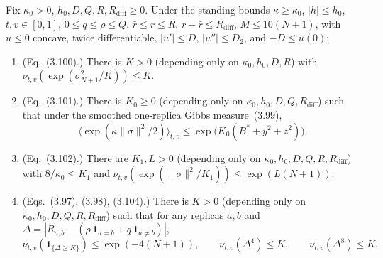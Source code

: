 \begin{lemma}\label{lem:sg-tal:st-aux-tails}
  \leanok
Fix $\kappa_0>0$, $h_0,D,Q,R,R_{\mathrm{diff}}\ge0$. Under the standing bounds $\kappa\ge\kappa_0$,
$|h|\le h_0$, $t,v\in[0,1]$, $0\le q\le\rho\le Q$, $\bar r\le r\le R$, $r-\bar r\le R_{\mathrm{diff}}$,
$M\le 10(N+1)$, with $u\le0$ concave, twice differentiable, $|u'|\le D$, $|u''|\le D_2$, and $-D\le u(0)$:
\begin{enumerate}
\item (Eq.~(3.100).) There is $K>0$ (depending only on $\kappa_0,h_0,D,R$) with
$\nu_{t,v}(\exp(\sigma_{N+1}^2/K))\le K$.
\item (Eq.~(3.101).) There is $K_0\ge0$ (depending only on $\kappa_0,h_0,D,Q,R_{\mathrm{diff}}$) such that
under the smoothed one-replica Gibbs measure~(3.99),
\[
\bigl\langle\exp(\kappa\|\sigma\|^2/2)\bigr\rangle_{t,v}\le\exp\bigl(K_0(B^*+y^2+z^2)\bigr).
\]
\item (Eq.~(3.102).) There are $K_1,L>0$ (depending only on $\kappa_0,h_0,D,Q,R,R_{\mathrm{diff}}$) with
$8/\kappa_0\le K_1$ and $\nu_{t,v}(\exp(\|\sigma\|^2/K_1))\le\exp(L(N+1))$.
\item (Eqs.~(3.97), (3.98), (3.104).) There is $K>0$ (depending only on $\kappa_0,h_0,D,Q,R,R_{\mathrm{diff}}$)
such that for any replicas $a,b$ and $\Delta=|R_{a,b}-(\rho\,\mathbf 1_{a=b}+q\,\mathbf 1_{a\ne b})|$,
\[
\nu_{t,v}(\mathbf 1_{\{\Delta\ge K\}})\le\exp(-4(N+1)),
\qquad
\nu_{t,v}(\Delta^4)\le K,
\qquad
\nu_{t,v}(\Delta^8)\le K.
\]
\end{enumerate}
\end{lemma}
